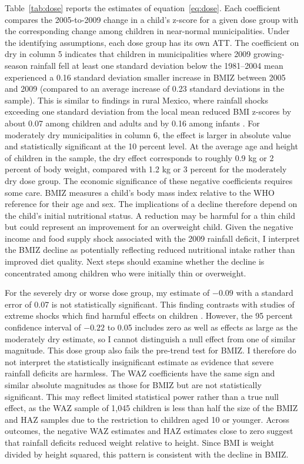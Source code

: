 \documentclass[12pt]{article}
\begin{document}
Table~\ref{tab:dose} reports the estimates of equation~\eqref{eq:dose}. Each coefficient compares the 2005-to-2009 change in a child's z-score for a given dose group with the corresponding change among children in near-normal municipalities. Under the identifying assumptions, each dose group has its own ATT. The coefficient on dry in column 5 indicates that children in municipalities where 2009 growing-season rainfall fell at least one standard deviation below the 1981--2004 mean experienced a 0.16 standard deviation smaller increase in BMIZ between 2005 and 2009 (compared to an average increase of 0.23 standard deviations in the sample). This is similar to findings in rural Mexico, where rainfall shocks exceeding one standard deviation from the local mean reduced BMI z-scores by about 0.07 among children and adults and by 0.16 among infants \parencite{adhvaryuHelpingChildrenCatch2024}. For moderately dry municipalities in column 6, the effect is larger in absolute value and statistically significant at the 10 percent level. At the average age and height of children in the sample, the dry effect corresponds to roughly 0.9 kg or 2 percent of body weight, compared with 1.2 kg or 3 percent for the moderately dry dose group. The economic significance of these negative coefficients requires some care. BMIZ measures a child's body mass index relative to the WHO reference for their age and sex. The implications of a decline therefore depend on the child's initial nutritional status. A reduction may be harmful for a thin child but could represent an improvement for an overweight child. Given the negative income and food supply shock associated with the 2009 rainfall deficit, I interpret the BMIZ decline as potentially reflecting reduced nutritional intake rather than improved diet quality. Next steps should examine whether the decline is concentrated among children who were initially thin or overweight.

For the severely dry or worse dose group, my estimate of $-0.09$ with a standard error of 0.07 is not statistically significant. This finding contrasts with studies of extreme shocks which find harmful effects on children \parencite{aldermanLongTermConsequences2006}. However, the 95 percent confidence interval of $-0.22$ to 0.05 includes zero as well as effects as large as the moderately dry estimate, so I cannot distinguish a null effect from one of similar magnitude. This dose group also fails the pre-trend test for BMIZ. I therefore do not interpret the statistically insignificant estimate as evidence that severe rainfall deficits are harmless. The WAZ coefficients have the same sign and similar absolute magnitudes as those for BMIZ but are not statistically significant. This may reflect limited statistical power rather than a true null effect, as the WAZ sample of 1,045 children is less than half the size of the BMIZ and HAZ samples due to the restriction to children aged 10 or younger. Across outcomes, the negative WAZ estimates and HAZ estimates close to zero suggest that rainfall deficits reduced weight relative to height. Since BMI is weight divided by height squared, this pattern is consistent with the decline in BMIZ.
\end{document}
